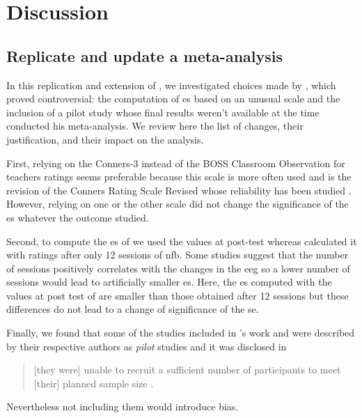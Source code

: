 


\section{Discussion}

\subsection{Replicate and update a meta-analysis}

In this replication and extension of \citet{Cortese2016}, we investigated choices made by \citeauthor{Cortese2016}, 
which proved controversial: the computation of \gls{es} based on an unusual scale \citep{Steiner2014} and the inclusion 
of a pilot study \citep{Arnold2014} whose final results weren't available at the time \citeauthor{Cortese2016} 
conducted his meta-analysis. We review here the list of changes, their justification, and their impact on the analysis.
 
First, relying on the Conners-3 \citep{Conners2008} instead of the BOSS Classroom Observation \citep{Shapiro2010} 
for teachers ratings seems preferable because this scale is more often used \citep{Christiansen2014, 
Bluschke2016} and is the revision of the Conners Rating Scale Revised \citep{Conners1998} whose reliability has been studied 
\citep{Collett2003}. However, relying on one or the other scale did not 
change the significance of the \gls{es} whatever the outcome studied.

Second, to compute the \gls{es} of \citet{Arnold2014} we used the values at post-test
whereas \citeauthor{Cortese2016} calculated it with ratings 
after only 12 sessions of \gls{nfb}. Some studies suggest that the number of sessions positively 
correlates with the changes in the \gls{eeg} \citep{Vernon2004} so a lower number of sessions would lead to 
artificially smaller \gls{es}. Here, the \gls{es} computed with the values at post test of \citet{Arnold2014} 
are smaller than those obtained after 12 sessions but these differences do not lead to a change of significance of the \gls{se}. 

Finally, we found that some of the studies included in \citeauthor{Cortese2016}'s work 
\citep{Arnold2014} and \citep{Steiner2011} were described by their respective authors as \emph{pilot} 
studies and it was disclosed in \citet{VanDongen2013, vanDongenBoomsma2015} \begin{quote} [they were] unable to recruit a sufficient 
number of participants to meet [their] planned sample size .\end{quote} Nevertheless not including them would introduce bias.

